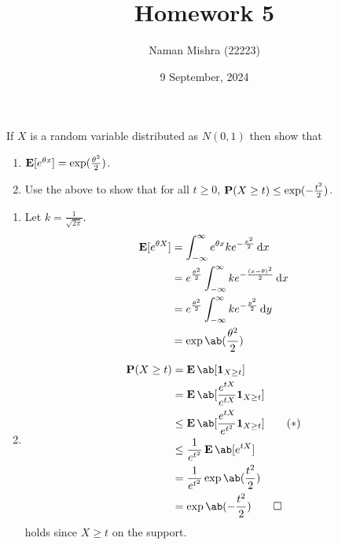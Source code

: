 \documentclass[12pt]{article}
\title{Homework 5}
\author{Naman Mishra (22223)}
\date{9 September, 2024}
\begin{document}
\maketitle

\begin{problem*}
    If $X$ is a random variable distributed as $N(0, 1)$ then show that
    \begin{enumerate}
        \item $\E[e^{\theta x}] = \exp(\frac{\theta^2}{2})$.
        \item Use the above to show that for all $t \ge 0$,
        $\P(X \ge t) \le \exp(-\frac{t^2}{2})$.
    \end{enumerate}
\end{problem*}
\begin{solution} \leavevmode
    \begin{enumerate}
        \item Let $k = \frac1{\sqrt{2\pi}}$.
        \begin{align*}
            \E[e^{\theta X}]
            &= \int_{-\infty}^\infty e^{\theta x}
                k e^{-\frac{x^2}{2}} \dd x \\
            &= e^{\frac{\theta^2}{2}}
                \int_{-\infty}^\infty k e^{-\frac{(x-\theta)^2}{2}} \dd x \\
            &= e^{\frac{\theta^2}{2}}
                \int_{-\infty}^\infty k e^{-\frac{y^2}{2}} \dd y \\
            &= \exp\ab(\frac{\theta^2}{2})
        \end{align*}
        \item \begin{align*}
            \P(X \ge t)
            &= \E\ab[\1{X \ge t}] \\
            &= \E\ab[\frac{e^{tX}}{e^{tX}} \1{X \ge t}] \\
            &\le \E\ab[\frac{e^{tX}}{e^{t^2}} \1{X \ge t}] \tag{$*$} \label{eq:ind} \\
            &\le \frac1{e^{t^2}} \E\ab[e^{tX}] \\
            &= \frac1{e^{t^2}} \exp\ab(\frac{t^2}{2}) \\
            &= \exp\ab(-\frac{t^2}{2}) \qedhere
        \end{align*}
         holds since $X \ge t$ on the support.
    \end{enumerate}
\end{solution}
\end{document}
